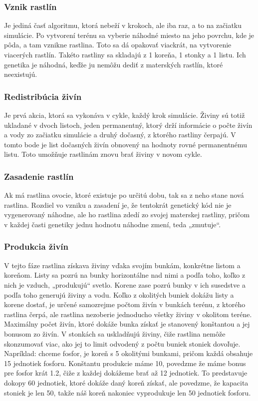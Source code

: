 \documentclass[12pt]{article}
\begin{document}
\subsubsection{Vznik rastlín}

Je jediná časť algoritmu, ktorá nebeží v krokoch, ale iba raz, a to na začiatku
simulácie. Po vytvorení terénu sa vyberie náhodné miesto na jeho povrchu, kde
je pôda, a tam vznikne rastlina. Toto sa dá opakovať viackrát, na vytvorenie
viacerých rastlín. Takéto rastliny sa skladajú z 1 koreňa, 1 stonky a 1 listu.
Ich genetika je náhodná, keďže ju nemôžu dediť z materských rastlín, ktoré
neexistujú.

\subsubsection{Redistribúcia živín}

Je prvá akcia, ktorá sa vykonáva v cykle, každý krok simulácie. Živiny sú totiž
ukladané v dvoch listoch, jeden permanentný, ktorý drží informácie o počte
živín a vody zo začiatku simulácie a druhý dočasný, z ktorého rastliny čerpajú.
V tomto bode je list dočasných živín obnovený na hodnoty rovné permanentnému listu.
Toto umožňuje rastlinám znovu brať živiny v novom cykle.

\subsubsection{Zasadenie rastlín}

Ak má rastlina ovocie, ktoré existuje po určitú dobu, tak sa z neho stane nová
rastlina. Rozdiel vo vzniku a zasadení je, že tentokrát genetický kód nie je
vygenerovaný náhodne, ale ho rastlina zdedí zo svojej materskej rastliny,
pričom v každej časti genetiky jednu hodnotu náhodne zmení, teda „zmutuje“.

\subsubsection{Produkcia živín}

V tejto fáze rastlina získava živiny vďaka svojím bunkám, konkrétne listom
a koreňom. Listy sa pozrú na bunky horizontálne nad nimi a podľa toho, koľko
z nich je vzduch, „produkujú“ svetlo. Korene zase pozrú bunky v ich susedstve
a podľa toho generujú živiny a vodu. Koľko z okolitých buniek dokážu listy
a korene dostať, je určené samozrejme počtom živín v bunkách terénu, z ktorého
rastlina čerpá, ale rastlina nezoberie jednoducho všetky živiny v okolitom
teréne. Maximálny počet živín, ktoré dokáže bunka získať je stanovený
konštantou a jej bonusom zo živín. V stonkách sa uskladňujú živiny, čiže
rastlina nemôže skonzumovať viac, ako jej to limit odvodený z počtu buniek
stoniek dovoľuje. Napríklad: chceme fosfor, je koreň s 5 okolitými bunkami,
pričom každá obsahuje 15 jednotiek fosforu. Konštantu produkcie máme 10,
povedzme že máme bonus pre fosfor krát 1.2, čiže z každej dokážeme brať až 12
jednotiek. To predstavuje dokopy 60 jednotiek, ktoré dokáže daný koreň získať,
ale povedzme, že kapacita stoniek je len 50, takže náš koreň nakoniec
vyprodukuje len 50 jednotiek fosforu.
\end{document}
